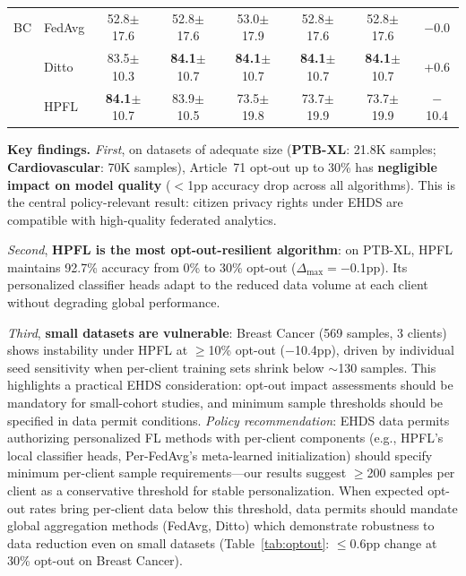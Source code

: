 \documentclass[conference]{IEEEtran}
\begin{document}
\begin{table}[t]
\begin{tabular}{ll ccccc c}
\midrule
BC & FedAvg & 52.8{\tiny$\pm$17.6} & 52.8{\tiny$\pm$17.6} & 53.0{\tiny$\pm$17.9} & 52.8{\tiny$\pm$17.6} & 52.8{\tiny$\pm$17.6} & $-$0.0 \\
 & Ditto & 83.5{\tiny$\pm$10.3} & \textbf{84.1}{\tiny$\pm$10.7} & \textbf{84.1}{\tiny$\pm$10.7} & \textbf{84.1}{\tiny$\pm$10.7} & \textbf{84.1}{\tiny$\pm$10.7} & +0.6 \\
 & HPFL & \textbf{84.1}{\tiny$\pm$10.7} & 83.9{\tiny$\pm$10.5} & 73.5{\tiny$\pm$19.8} & 73.7{\tiny$\pm$19.9} & 73.7{\tiny$\pm$19.9} & $-$10.4 \\
\bottomrule
\end{tabular}
\end{table}

\textbf{Key findings.}
\textit{First}, on datasets of adequate size (\textbf{PTB-XL}: 21.8K samples; \textbf{Cardiovascular}: 70K samples), Article~71 opt-out up to 30\% has \textbf{negligible impact on model quality} ($<$1pp accuracy drop across all algorithms). This is the central policy-relevant result: citizen privacy rights under EHDS are compatible with high-quality federated analytics.

\textit{Second}, \textbf{HPFL is the most opt-out-resilient algorithm}: on PTB-XL, HPFL maintains 92.7\% accuracy from 0\% to 30\% opt-out ($\Delta_{\max} = -$0.1pp). Its personalized classifier heads adapt to the reduced data volume at each client without degrading global performance.

\textit{Third}, \textbf{small datasets are vulnerable}: Breast Cancer (569 samples, 3 clients) shows instability under HPFL at $\geq$10\% opt-out ($-$10.4pp), driven by individual seed sensitivity when per-client training sets shrink below $\sim$130 samples. This highlights a practical EHDS consideration: opt-out impact assessments should be mandatory for small-cohort studies, and minimum sample thresholds should be specified in data permit conditions. \textit{Policy recommendation}: EHDS data permits authorizing personalized FL methods with per-client components (e.g., HPFL's local classifier heads, Per-FedAvg's meta-learned initialization) should specify minimum per-client sample requirements---our results suggest $\geq$200 samples per client as a conservative threshold for stable personalization. When expected opt-out rates bring per-client data below this threshold, data permits should mandate global aggregation methods (FedAvg, Ditto) which demonstrate robustness to data reduction even on small datasets (Table~\ref{tab:optout}: $\leq$0.6pp change at 30\% opt-out on Breast Cancer).
\end{document}
